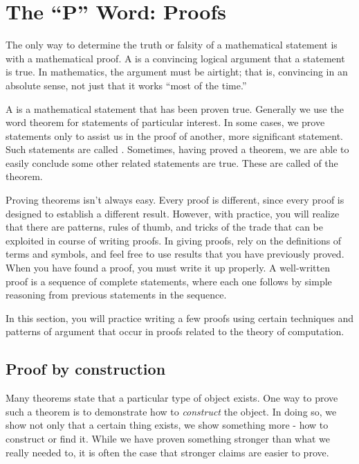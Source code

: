 
\section{The ``P'' Word: Proofs}

\begin{discussion}
The only way to determine the truth or falsity of a mathematical statement is with a mathematical proof. A  is a convincing logical argument that a statement is true. In mathematics, the argument must be airtight; that is, convincing in an absolute sense, not just that it works ``most of the time.''

A  is a mathematical statement that has been proven true. Generally we use the word theorem for statements of particular interest. In some cases, we prove statements only to assist us in the proof of another, more significant statement. Such statements are called . Sometimes, having proved a theorem, we are able to easily conclude some other related statements are true. These are called  of the theorem.

Proving theorems isn't always easy. Every proof is different, since every proof is designed to establish a different result. However, with practice, you will realize that there are patterns, rules of thumb, and tricks of the trade that can be exploited in course of writing proofs. In giving proofs, rely on the definitions of terms and symbols, and feel free to use results that you have previously proved. When you have found a proof, you must write it up properly. A well-written proof is a sequence of complete statements, where each one follows by simple reasoning from previous statements in the sequence.

In this section, you will practice writing a few proofs using certain techniques and patterns of argument that occur in proofs related to the theory of computation.
\end{discussion}

\subsection{Proof by construction}

\begin{discussion}
Many theorems state that a particular type of object exists. One way to prove such a theorem is to demonstrate how to \emph{construct} the object. In doing so, we show not only that a certain thing exists, we show something more - how to construct or find it. While we have proven something stronger than what we really needed to, it is often the case that stronger claims are easier to prove.
\end{discussion}

